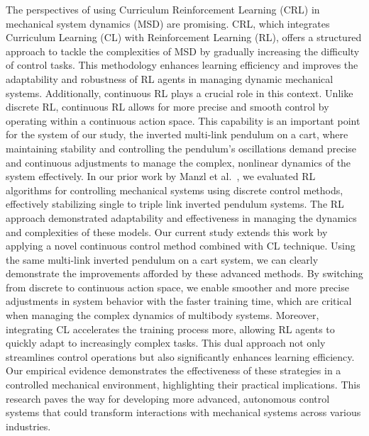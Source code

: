 The perspectives of using Curriculum Reinforcement Learning (CRL) in mechanical system dynamics (MSD) are promising. CRL, which integrates Curriculum Learning (CL) with Reinforcement Learning (RL), offers a structured approach to tackle the complexities of MSD by gradually increasing the difficulty of control tasks. This methodology enhances learning efficiency and improves the adaptability and robustness of RL agents in managing dynamic mechanical systems. Additionally, continuous RL plays a crucial role in this context. Unlike discrete RL, continuous RL allows for more precise and smooth control by operating within a continuous action space. This capability is an important point for the system of our study, the inverted multi-link pendulum on a cart, where maintaining stability and controlling the pendulum’s oscillations demand precise and continuous adjustments to manage the complex, nonlinear dynamics of the system effectively. In our prior work by Manzl et al.~\cite{manzl2023relrl}, we evaluated RL algorithms for controlling mechanical systems using discrete control methods, effectively stabilizing single to triple link inverted pendulum systems. The RL approach demonstrated adaptability and effectiveness in managing the dynamics and complexities of these models. Our current study extends this work by applying a novel continuous control method combined with CL technique. Using the same multi-link inverted pendulum on a cart system, we can clearly demonstrate the improvements afforded by these advanced methods. By switching from discrete to continuous action space, we enable smoother and more precise adjustments in system behavior with the faster training time, which are critical when managing the complex dynamics of multibody systems. Moreover, integrating CL accelerates the training process more, allowing RL agents to quickly adapt to increasingly complex tasks. This dual approach not only streamlines control operations but also significantly enhances learning efficiency. Our empirical evidence demonstrates the effectiveness of these strategies in a controlled mechanical environment, highlighting their practical implications. This research paves the way for developing more advanced, autonomous control systems that could transform interactions with mechanical systems across various industries.